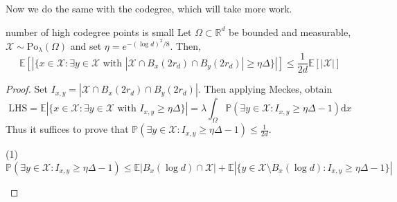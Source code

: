 \documentclass{article}
\begin{document}
Now we do the same with the codegree, which will take more work. 

\begin{lemma}[]{number of high codegree points is small}
    Let $\Omega \subset \mathbb{R}^d$ be bounded and measurable, $\mathcal{X} \sim \text{Po}_\lambda(\Omega)$ and set 
    $\eta = e^{-(\log d)^2/8}$. Then, \[\mathbb{E}\left[\left|\{x \in \mathcal{X} : \exists y \in \mathcal{X} \text{ with }
    |\mathcal{X} \cap B_x(2r_d) \cap B_y(2r_d)| \geq \eta \Delta\}\right|\right] \leq \frac{1}{2d}\mathbb{E}[|\mathcal{X}|]\]
\end{lemma}

\begin{proof}
    Set $I_{x,y} = |\mathcal{X} \cap B_x(2r_d) \cap B_y(2r_d)|$. Then applying Meckes, obtain 
    \[\text{LHS} = \mathbb{E}\left|\{x \in \mathcal{X} : \exists y \in \mathcal{X} \text{ with } I_{x,y}
    \geq \eta \Delta\}\right| = \lambda \int_{\Omega}\mathbb{P}(\exists y \in \mathcal{X} : I_{x,y} \geq 
    \eta \Delta -1)\mathrm{d}x\] 
    Thus it suffices to prove that $\mathbb{P}(\exists y \in \mathcal{X} : I_{x,y} \geq \eta \Delta - 1) \leq \frac{1}{2d}$.
    \begin{claim}[]{(1)}
        \[\mathbb{P}(\exists y \in \mathcal{X} : I_{x,y} \geq \eta \Delta -1) \leq \mathbb{E}|B_x(\log d) \cap \mathcal{X}|
        + \mathbb{E}|\{y \in \mathcal{X} \setminus B_x(\log d) : I_{x,y} \geq \eta \Delta - 1\}|\]
    \end{claim}


\end{proof}
\end{document}
